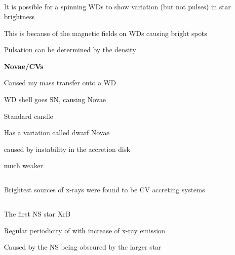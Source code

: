 \documentclass{article}
\begin{document}
\subsection{}
\begin{list}{-}{}
\item It is possible for a spinning WDs to show variation (but not pulses) in star brightness
\item This is because of the magnetic fields on WDs causing bright spots
\item Pulsation can be determined by the density 
\end{list}
\noindent \textbf{\large Novae/CVs}
\begin{list}{-}{}
\item Caused my mass transfer onto a WD
\item WD shell goes SN, causing Novae
\item Standard candle
\item Has a variation called dwarf Novae 
\item caused by instability in the accretion disk
\item much weaker
\end{list}

\subsection{}
\begin{list}{-}{}
\item Brightest sources of x-rays were found to be CV accreting systems
\end{list}

\subsection{}
\begin{list}{-}{}
\item The first NS star XrB
\item Regular periodicity of with increase of x-ray emission
\item Caused by the NS being obscured by the larger star
\end{list}
\end{document}

